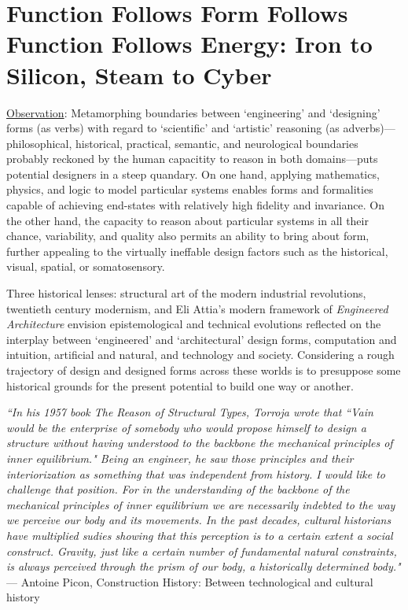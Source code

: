 \section{Function Follows Form Follows Function Follows Energy: Iron to Silicon, Steam to Cyber}

\underline{Observation}: Metamorphing boundaries between `engineering' and `designing' forms (as verbs) with regard to `scientific' and `artistic' reasoning (as adverbs)---philosophical, historical, practical, semantic, and neurological boundaries probably reckoned by the human capacitity to reason in both domains---puts potential designers in a steep quandary. On one hand, applying mathematics, physics, and logic to model particular systems enables forms and formalities capable of achieving end-states with relatively high fidelity and invariance. On the other hand, the capacity to reason about particular systems in all their chance, variability, and quality also permits an ability to bring about form, further appealing to the virtually ineffable design factors such as the historical, visual, spatial, or somatosensory.

Three historical lenses: structural art of the modern industrial revolutions, twentieth century modernism, and Eli Attia's modern framework of \textit{Engineered Architecture} envision epistemological and technical evolutions reflected on the interplay between `engineered' and `architectural' design forms, computation and intuition, artificial and natural, and technology and society. Considering a rough trajectory of design and designed forms across these worlds is to presuppose some historical grounds for the present potential to build one way or another.

\begin{flushright}
  \small{
  \textit{``In his 1957 book \textrm{The Reason of Structural Types}, Torroja wrote that ``Vain would be the enterprise of somebody who would propose himself to design a structure without having understood to the backbone the mechanical principles of inner equilibrium." Being an engineer, he saw those principles and their interiorization as something that was independent from history. I would like to challenge that position. For in the understanding of the backbone of the mechanical principles of inner equilibrium we are necessarily indebted to the way we perceive our body and its movements. In the past decades, cultural historians have multiplied sudies showing that this perception is to a certain extent a social construct. Gravity, just like a certain number of fundamental natural constraints, is always perceived through the prism of our body, a historically determined body."}} \\ --- Antoine Picon, Construction History: Between technological and cultural history
\end{flushright}

